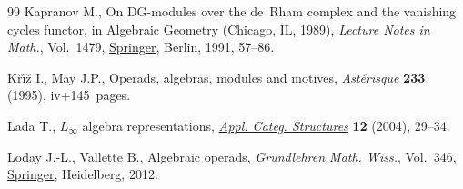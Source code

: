 \documentclass[11pt]{article}
\numberwithin{equation}{section}
\numberwithin{equation}{section}
\begin{document}
\begin{thebibliography}{99}
Kapranov M., On {DG}-modules over the de~{R}ham complex and the vanishing
 cycles functor, in Algebraic {G}eometry ({C}hicago, {IL}, 1989),
 \textit{Lecture Notes in Math.}, Vol.~1479, \href{https://doi.org/10.1007/BFb0086264}{Springer}, Berlin, 1991, 57--86.

K\v{r}\'{\i}\v{z} I., May J.P., Operads, algebras, modules and motives,
 \textit{Ast\'erisque} \textbf{233} (1995), iv+145~pages.

Lada T., {$L_\infty$} algebra representations, \href{https://doi.org/10.1023/B:APCS.0000013809.71153.30}{\textit{Appl. Categ. Structures}}
 \textbf{12} (2004), 29--34.

Loday J.-L., Vallette B., Algebraic operads, \textit{Grundlehren Math. Wiss.},
 Vol.~346, \href{https://doi.org/10.1007/978-3-642-30362-3}{Springer}, Heidelberg, 2012.

\end{thebibliography}
\end{document}
